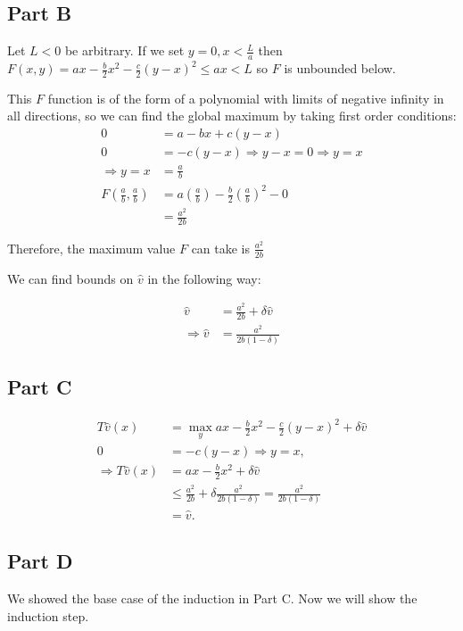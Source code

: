 \documentclass[11pt]{article} %
\begin{document}
\subsection{Part B}

Let $L<0$ be arbitrary. If we set $y=0,x<\frac{L}{a}$ then $F(x,y) = ax -\frac{b}{2}x^2 - \frac{c}{2}(y-x)^2 \leq ax<L$ so $F$ is unbounded below.

This $F$ function is of the form of a polynomial with limits of negative infinity in all directions, so we can find the global maximum by taking first order conditions:
 \begin{align*}
0 &= a - bx + c(y-x)\\
0 &= -c(y-x) \Rightarrow y-x = 0 \Rightarrow y=x\\
\Rightarrow y = x &= \frac{a}{b}\\
F\left( \frac{a}{b},\frac{a}{b} \right) &= a\left(\frac{a}{b}\right) - \frac{b}{2}\left( \frac{a}{b}\right)^2 - 0\\
&= \frac{a^2}{2b}
\end{align*}

Therefore, the maximum value $F$ can take is $\frac{a^2}{2b}$

We can find bounds on $\hat{v}$ in the following way:

\begin{align*}
\hat{v} &= \frac{a^2}{2b} + \delta \hat{v}\\
\Rightarrow \hat{v} &= \frac{a^2}{2b(1-\delta)} 
\end{align*}

\subsection{Part C}
\begin{align*}
T\hat{v}(x) &= \max_{y} ax - \frac{b}{2}x^2 - \frac{c}{2}(y-x)^2 + \delta \hat{v}\\
0 &= -c(y-x) \Rightarrow y=x,\\
\Rightarrow T\hat{v}(x) &= ax -\frac{b}{2}x^2 +\delta \hat{v} \\
&\leq \frac{a^2}{2b} +\delta \frac{a^2}{2b(1-\delta)} = \frac{a^2}{2b(1-\delta)}\\
&= \hat{v}.
\end{align*}

\subsection{Part D}
We showed the base case of the induction in Part C. Now we will show the induction step.
\end{document}
